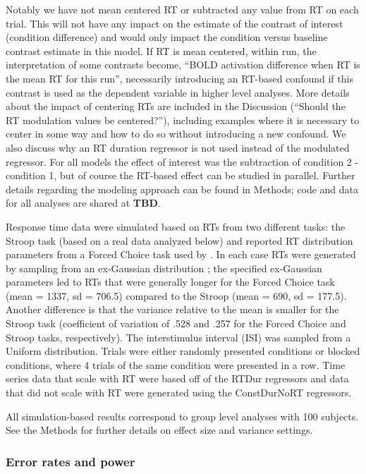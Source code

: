 \documentclass[titlepage,12pt] {article}
\begin{document}
Notably we have not mean centered RT or subtracted any value from RT on each trial.  This will not have any impact on the estimate of the contrast of interest (condition difference) and would only impact the condition versus baseline contrast estimate in this model.  If RT is mean centered, within run, the interpretation of some contrasts become, ``BOLD activation difference when RT is the mean RT for this run'', necessarily introducing an RT-based confound if this contrast is used as the dependent variable in higher level analyses.  More details about the impact of centering RTs are included in the Discussion (``Should the RT modulation values be centered?''), including examples where it is necessary to center in some way and how to do so without introducing a new confound.  We also discuss why an RT duration regressor is not used instead of the modulated regressor. For all models the effect of interest was the subtraction of condition 2 - condition 1, but of course the RT-based effect can be studied in parallel.  Further details regarding the modeling approach can be found in Methods; code and data for all analyses are shared at \textbf{TBD}.

Response time data were simulated based on RTs from two different tasks: the Stroop task (based on a real data analyzed below) and reported RT distribution parameters from a Forced Choice task used by \citet{grinband_detection_2008}.  In each case RTs were generated by sampling from an ex-Gaussian distribution \citep{Ratcliff1976RetrievalPI}; the specified ex-Gaussian parameters led to RTs that were generally longer for the Forced Choice task (mean = 1337, sd = 706.5) compared to the Stroop (mean = 690, sd = 177.5).  Another difference is that the variance relative to the mean is smaller for the Stroop task (coefficient of variation of .528 and .257 for the Forced Choice and Stroop tasks, respectively).   The interstimulus interval (ISI) was sampled from a Uniform distribution. Trials were either randomly presented conditions or blocked conditions, where 4 trials of the same condition were presented in a row.  Time series data that scale with RT were based off of the RTDur regressors and data that did not scale with RT were generated using the ConstDurNoRT regressors. 

All simulation-based results correspond to group level analyses with 100 subjects.  See the Methods for further details on effect size and variance settings.


\subsubsection*{Error rates and power}
 
\end{document}
